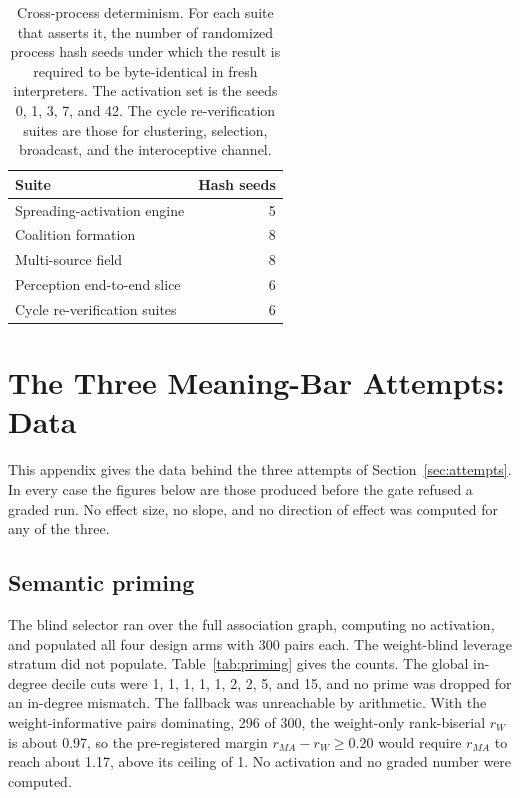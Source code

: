 \documentclass[11pt]{article}
\begin{document}
\begin{table}[t]
  \centering
  \caption{Cross-process determinism. For each suite that asserts it, the number of
    randomized process hash seeds under which the result is required to be byte-identical in
    fresh interpreters. The activation set is the seeds 0, 1, 3, 7, and 42. The cycle
    re-verification suites are those for clustering, selection, broadcast, and the
    interoceptive channel.}
  \label{tab:seeds}
  \small
  \begin{tabular}{@{}lr@{}}
    \toprule
    Suite & Hash seeds \\
    \midrule
    Spreading-activation engine & 5 \\
    Coalition formation & 8 \\
    Multi-source field & 8 \\
    Perception end-to-end slice & 6 \\
    Cycle re-verification suites & 6 \\
    \bottomrule
  \end{tabular}
\end{table}

\section{The Three Meaning-Bar Attempts: Data}\label{app:attempts-data}

This appendix gives the data behind the three attempts of Section~\ref{sec:attempts}. In
every case the figures below are those produced before the gate refused a graded run. No
effect size, no slope, and no direction of effect was computed for any of the three.

\subsection{Semantic priming}

The blind selector ran over the full association graph, computing no activation, and
populated all four design arms with 300 pairs each. The weight-blind leverage stratum did
not populate. Table~\ref{tab:priming} gives the counts. The global in-degree decile cuts
were 1, 1, 1, 1, 1, 2, 2, 5, and 15, and no prime was dropped for an in-degree mismatch.
The fallback was unreachable by arithmetic. With the weight-informative pairs dominating,
296 of 300, the weight-only rank-biserial $r_W$ is about 0.97, so the pre-registered margin
$r_{MA} - r_W \ge 0.20$ would require $r_{MA}$ to reach about 1.17, above its ceiling of 1.
No activation and no graded number were computed.
\end{document}
